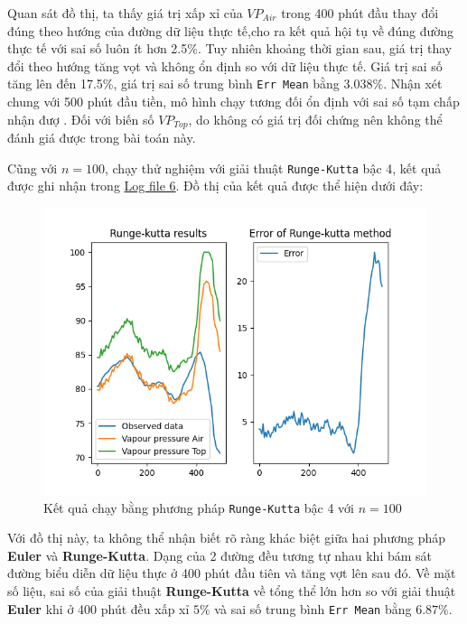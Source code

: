 \documentclass[a4paper]{article}
\begin{document}
Quan sát đồ thị, ta thấy giá trị xấp xỉ của $ VP_{Air}$ trong 400 phút đầu thay đổi đúng theo hướng của đường dữ liệu thực tế,cho ra kết quả hội tụ về đúng đường thực tế với sai số luôn ít hơn 2.5\%. Tuy nhiên khoảng thời gian sau, giá trị thay đổi theo hướng tăng vọt và không ổn định so với dữ liệu thực tế. Giá trị sai số tăng lên đến 17.5\%, giá trị sai số trung bình \texttt{Err Mean} bằng $3.038\%$. Nhận xét chung với 500 phút đầu tiền, mô hình chạy tương đối ổn định với sai số tạm chấp nhận đượ . Đối với biến số $VP_{Top}$, do không có giá trị đối chứng nên không thể đánh giá được trong bài toán này.
\newpage

Cũng với $n = 100$, chạy thử nghiệm với giải thuật \texttt{Runge-Kutta} bậc 4, kết quả được ghi nhận trong \href{https://files.catbox.moe/ldq256.txt}{Log file 6}. Đồ thị của kết quả được thể hiện dưới đây:

\begin{figure}[H]
    \centering
    \includegraphics[width=1.0\textwidth]{rk4_100.png}
    \caption{Kết quả chạy bằng phương pháp \texttt{Runge-Kutta} bậc 4 với $n=100$}
    \label{fig:rk4_100}
\end{figure}

Với đồ thị này, ta không thể nhận biết rõ ràng khác biệt giữa hai phương pháp \textbf{Euler} và \textbf{Runge-Kutta}. Dạng của 2 đường đều tương tự nhau khi bám sát đường biểu diễn dữ liệu thực ở 400 phút đầu tiên và tăng vợt lên sau đó. Về mặt số liệu, sai số của giải thuật \textbf{Runge-Kutta} về tổng thể lớn hơn so với giải thuật \textbf{Euler} khi ở 400 phút đều xấp xỉ $5\%$ và sai số trung bình  \texttt{Err Mean} bằng $6.87\%$.
\newpage
\end{document}
